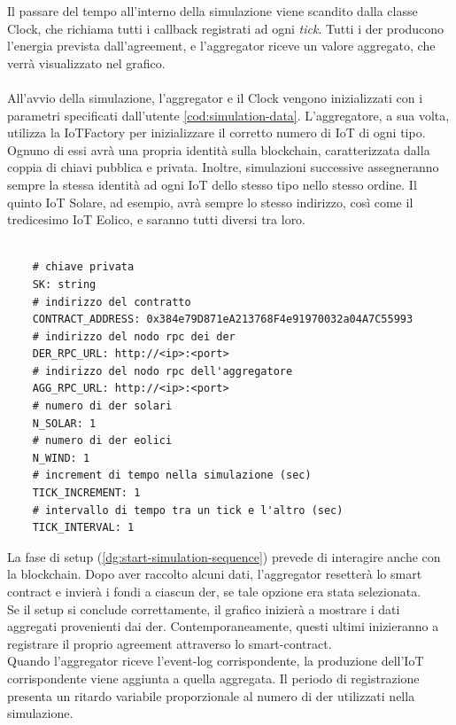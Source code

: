 Il passare del tempo all'interno della simulazione viene scandito dalla classe Clock, che richiama tutti i callback registrati ad ogni \textit{tick}.
Tutti i \gls{der} producono l'energia prevista dall'\gls{agreement}, e l'\gls{aggregator} riceve un valore aggregato, che verrà visualizzato nel grafico. \\
\\
All'avvio della simulazione, l'\gls{aggregator} e il Clock vengono inizializzati con i parametri specificati dall'utente \autoref{cod:simulation-data}.
L'aggregatore, a sua volta, utilizza la IoTFactory per inizializzare il corretto numero di IoT di ogni tipo. \\
Ognuno di essi avrà una propria identità sulla \gls{blockchain}, caratterizzata dalla coppia di chiavi pubblica e privata.
Inoltre, simulazioni successive assegneranno sempre la stessa identità ad ogni IoT dello stesso tipo nello stesso ordine.
Il quinto IoT Solare, ad esempio, avrà sempre lo stesso indirizzo, così come il tredicesimo IoT Eolico, e saranno tutti diversi tra loro. \\
\\

\begin{verbatim}
    # chiave privata
    SK: string 
    # indirizzo del contratto
    CONTRACT_ADDRESS: 0x384e79D871eA213768F4e91970032a04A7C55993 
    # indirizzo del nodo rpc dei der
    DER_RPC_URL: http://<ip>:<port> 
    # indirizzo del nodo rpc dell'aggregatore
    AGG_RPC_URL: http://<ip>:<port>
    # numero di der solari
    N_SOLAR: 1
    # numero di der eolici
    N_WIND: 1
    # increment di tempo nella simulazione (sec)
    TICK_INCREMENT: 1
    # intervallo di tempo tra un tick e l'altro (sec)
    TICK_INTERVAL: 1
\end{verbatim}

La fase di setup (\autoref{dg:start-simulation-sequence}) prevede di interagire anche con la \gls{blockchain}.
Dopo aver raccolto alcuni dati, l'\gls{aggregator} resetterà lo smart contract e invierà i fondi a ciascun \gls{der}, se tale opzione era stata selezionata. \\
Se il setup si conclude correttamente, il grafico inizierà a mostrare i dati aggregati provenienti dai \gls{der}.
Contemporaneamente, questi ultimi inizieranno a registrare il proprio \gls{agreement} attraverso lo \gls{smart-contract}. \\
Quando l'\gls{aggregator} riceve l'\gls{event-log} corrispondente, la produzione dell'IoT corrispondente viene aggiunta a quella aggregata.
Il periodo di registrazione presenta un ritardo variabile proporzionale al numero di \gls{der} utilizzati nella simulazione. \\
\\

